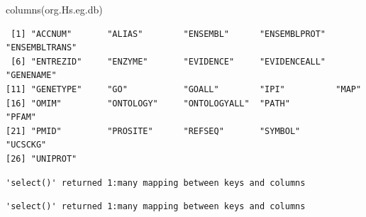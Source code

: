 \documentclass[
  letterpaper,
  DIV=11,
  numbers=noendperiod]{scrartcl}
\newenvironment{Shaded}{\begin{snugshade}}{\end{snugshade}}
\newcommand{\AttributeTok}[1]{\textcolor[rgb]{0.40,0.45,0.13}{#1}}
\newcommand{\FunctionTok}[1]{\textcolor[rgb]{0.28,0.35,0.67}{#1}}
\newcommand{\NormalTok}[1]{\textcolor[rgb]{0.00,0.23,0.31}{#1}}
\newcommand{\OtherTok}[1]{\textcolor[rgb]{0.00,0.23,0.31}{#1}}
\newcommand{\SpecialCharTok}[1]{\textcolor[rgb]{0.37,0.37,0.37}{#1}}
\newcommand{\StringTok}[1]{\textcolor[rgb]{0.13,0.47,0.30}{#1}}
\begin{document}
\begin{verbatim}
\end{verbatim}

\begin{Shaded}
\begin{Highlighting}[]
\FunctionTok{columns}\NormalTok{(org.Hs.eg.db)}
\end{Highlighting}
\end{Shaded}

\begin{verbatim}
 [1] "ACCNUM"       "ALIAS"        "ENSEMBL"      "ENSEMBLPROT"  "ENSEMBLTRANS"
 [6] "ENTREZID"     "ENZYME"       "EVIDENCE"     "EVIDENCEALL"  "GENENAME"    
[11] "GENETYPE"     "GO"           "GOALL"        "IPI"          "MAP"         
[16] "OMIM"         "ONTOLOGY"     "ONTOLOGYALL"  "PATH"         "PFAM"        
[21] "PMID"         "PROSITE"      "REFSEQ"       "SYMBOL"       "UCSCKG"      
[26] "UNIPROT"     
\end{verbatim}

\begin{Shaded}
\end{Shaded}

\begin{verbatim}
'select()' returned 1:many mapping between keys and columns
\end{verbatim}

\begin{Shaded}
\end{Shaded}

\begin{verbatim}
'select()' returned 1:many mapping between keys and columns
\end{verbatim}
\end{document}
